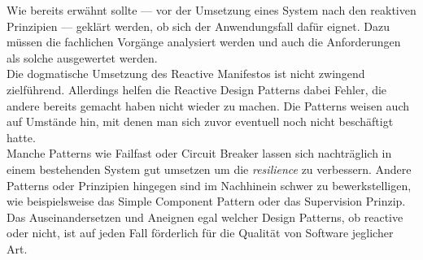 Wie bereits erwähnt sollte --- vor der Umsetzung eines System nach den reaktiven Prinzipien --- geklärt werden, ob sich der Anwendungsfall dafür eignet. Dazu müssen die fachlichen Vorgänge analysiert werden und auch die Anforderungen als solche ausgewertet werden.\\
Die dogmatische Umsetzung des Reactive Manifestos ist nicht zwingend zielführend. Allerdings helfen die Reactive Design Patterns dabei Fehler, die andere bereits gemacht haben nicht wieder zu machen. Die Patterns weisen auch auf Umstände hin, mit denen man sich zuvor eventuell noch nicht beschäftigt hatte.\\
Manche Patterns wie Failfast oder Circuit Breaker lassen sich nachträglich in einem bestehenden System gut umsetzen um die \textit{resilience} zu verbessern. Andere Patterns oder Prinzipien hingegen sind im Nachhinein schwer zu bewerkstelligen, wie beispielsweise das Simple Component Pattern oder das Supervision Prinzip.
Das Auseinandersetzen und Aneignen egal welcher Design Patterns, ob reactive oder nicht, ist auf jeden Fall förderlich für die Qualität von Software jeglicher Art.
